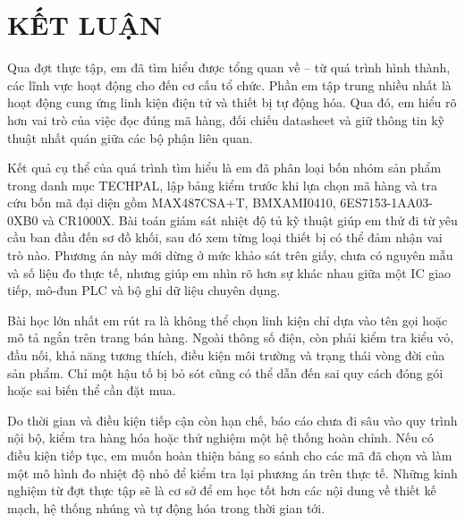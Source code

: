 \chapter*{KẾT LUẬN}

Qua đợt thực tập, em đã tìm hiểu được tổng quan về \CompanyName{} -- từ quá
trình hình thành, các lĩnh vực hoạt động cho đến cơ cấu tổ chức. Phần em tập
trung nhiều nhất là hoạt động cung ứng linh kiện điện tử và thiết bị tự động
hóa. Qua đó, em hiểu rõ hơn vai trò của việc đọc đúng mã hàng, đối chiếu
datasheet và giữ thông tin kỹ thuật nhất quán giữa các bộ phận liên quan.

Kết quả cụ thể của quá trình tìm hiểu là em đã phân loại bốn nhóm sản phẩm trong
danh mục TECHPAL, lập bảng kiểm trước khi lựa chọn mã hàng và tra cứu bốn mã đại
diện gồm MAX487CSA+T, BMXAMI0410, 6ES7153-1AA03-0XB0 và CR1000X. Bài toán giám
sát nhiệt độ tủ kỹ thuật giúp em thử đi từ yêu cầu ban đầu đến sơ đồ khối, sau
đó xem từng loại thiết bị có thể đảm nhận vai trò nào. Phương án này mới dừng ở
mức khảo sát trên giấy, chưa có nguyên mẫu và số liệu đo thực tế, nhưng giúp em
nhìn rõ hơn sự khác nhau giữa một IC giao tiếp, mô-đun PLC và bộ ghi dữ liệu
chuyên dụng.

Bài học lớn nhất em rút ra là không thể chọn linh kiện chỉ dựa vào tên gọi hoặc
mô tả ngắn trên trang bán hàng. Ngoài thông số điện, còn phải kiểm tra kiểu vỏ,
đầu nối, khả năng tương thích, điều kiện môi trường và trạng thái vòng đời của
sản phẩm. Chỉ một hậu tố bị bỏ sót cũng có thể dẫn đến sai quy cách đóng gói hoặc
sai biến thể cần đặt mua.

Do thời gian và điều kiện tiếp cận còn hạn chế, báo cáo chưa đi sâu vào quy trình
nội bộ, kiểm tra hàng hóa hoặc thử nghiệm một hệ thống hoàn chỉnh. Nếu có điều
kiện tiếp tục, em muốn hoàn thiện bảng so sánh cho các mã đã chọn và làm một mô
hình đo nhiệt độ nhỏ để kiểm tra lại phương án trên thực tế. Những kinh nghiệm
từ đợt thực tập sẽ là cơ sở để em học tốt hơn các nội dung về thiết kế mạch, hệ
thống nhúng và tự động hóa trong thời gian tới.

